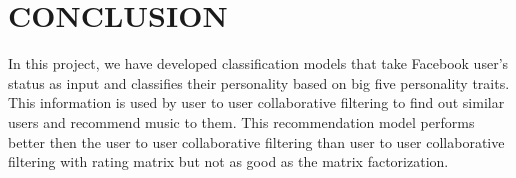 \newpage
\section{CONCLUSION}
In this project, we have developed classification models that take Facebook user's status as input and classifies their personality based on big five personality traits. This information is used by user to user collaborative filtering to find out similar users and recommend music to them. This recommendation model performs better then the user to user collaborative filtering than user to user collaborative filtering with rating matrix but not as good as the matrix factorization.